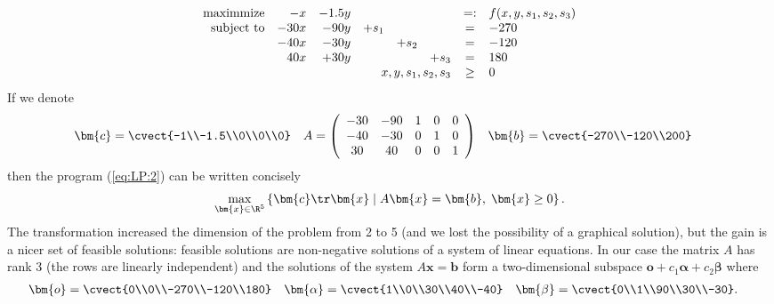 \begin{equation}
\label{eq:LP:2}
\begin{array}{rrrrrrcl}
  {\rm maximmize}     & -x   & -  1.5y &         &         &       & =: & f(x,y,s_1,s_2,s_3) \\
   {\rm subject\ to}& -30x & -  90y  & +   s_1 &         &       & =  & -270\\
                          & -40x & -  30y  &         & +   s_2 &       & =  & -120\\
                          &  40x & +  30y  &         &         &+  s_3 & =  & 180\\      
                          &      &         &     \multicolumn{3}{r}{x,y,s_1,s_2,s_3}  &\ge& 0
\end{array}
\end{equation}
%
If we denote
\begin{align*}
 \bm{c}&=\cvect{-1\\-1.5\\0\\0\\0}
&A&=\left(\begin{array}{ccccc}-30&-90&1&0&0\\-40&-30&0&1&0\\30&40&0&0&1\end{array}\right)
&\bm{b}&=\cvect{-270\\-120\\200}
\end{align*}
then the program (\ref{eq:LP:2}) can be written concisely
$$\max_{\bm{x}\in\R^5}\left\{ \bm{c}\tr\bm{x} \mid A\bm{x}=\bm{b},\; \bm{x}\ge0
\right\}.$$ 
The transformation increased the dimension of the problem from 2 to 5 (and we lost the possibility
of a graphical solution), but the gain is a nicer set of feasible solutions: feasible solutions
are non-negative solutions of a system of linear equations. In our case the matrix $A$ has rank 3
(the rows are linearly independent) and the solutions of the system
$A\bm{x}=\bm{b}$ 
form a two-dimensional subspace
$\bm{o}+c_1\bm{\alpha}+c_2\bm{\beta}$ where
\begin{align*}
\bm{o}&=\cvect{0\\0\\-270\\-120\\180}
      &\bm{\alpha}&=\cvect{1\\0\\30\\40\\-40}
      &\bm{\beta}&=\cvect{0\\1\\90\\30\\-30}.
\end{align*}
